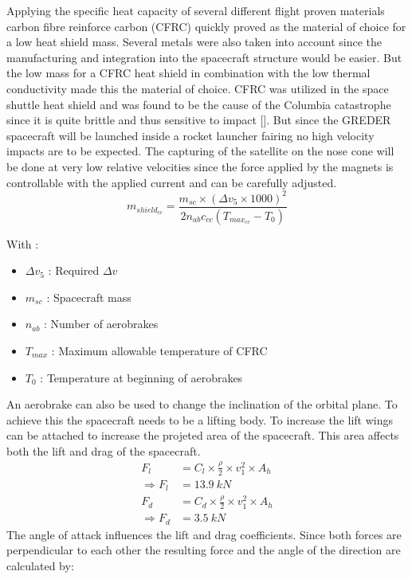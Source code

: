 Applying the specific heat capacity of several different flight proven materials carbon fibre reinforce carbon (CFRC) quickly proved as the material of choice for a low heat shield mass. Several metals were also taken into account since the manufacturing and integration into the spacecraft structure would be easier. But the low mass for a CFRC heat shield in combination with the low thermal conductivity made this the material of choice. CFRC was utilized in the space shuttle heat shield and was found to be the cause of the Columbia catastrophe since it is quite brittle and thus sensitive to impact []. But since the GREDER spacecraft will be launched inside a rocket launcher fairing no high velocity impacts are to be expected. The capturing of the satellite on the nose cone will be done at very low relative velocities since the force applied by the magnets is controllable with the applied current and can be carefully adjusted.
\begin{equation}
	m_{shield_{cc}}= \frac{m_{sc} \times (\Delta v_5\times 1000)^2}{2n_{ab}c_{cc}(T_{max_{cc}}-T_0)}
\end{equation}

With :
\begin{itemize}
	\item $\Delta v_5$ : Required $\Delta v$
	\item $m_{sc}$ : Spacecraft mass
	\item $n_{ab}$ : Number of aerobrakes
	\item $T_{max}$ : Maximum allowable temperature of CFRC
	\item $T_0$ : Temperature at beginning of aerobrakes
\end{itemize}
An aerobrake can also be used to change the inclination of the orbital plane. To achieve this the spacecraft needs to be a lifting body. To increase the lift wings can be attached to increase the projeted area of the spacecraft. This area affects both the lift and drag of the spacecraft.
\begin{align}
	F_l &= C_l\times\frac \rho 2 \times v_1^2 \times A_h\\
	\Rightarrow F_l &= 13.9\ kN\\
	F_d &= C_d\times\frac \rho 2 \times v_1^2 \times A_h\\
	\Rightarrow F_d &= 3.5\ kN
\end{align}
The angle of attack influences the lift and drag coefficients. Since both forces are perpendicular to each other the resulting force and the angle of the direction are calculated by:

